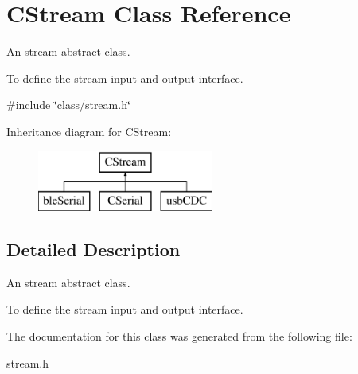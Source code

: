 \hypertarget{class_c_stream}{\section{C\-Stream Class Reference}
\label{class_c_stream}
}


An stream abstract class.\par
 To define the stream input and output interface.  




{\ttfamily \#include \char`\"{}class/stream.\-h\char`\"{}}

Inheritance diagram for C\-Stream\-:\begin{figure}[H]
\begin{center}
\leavevmode
\includegraphics[height=2.000000cm]{class_c_stream}
\end{center}
\end{figure}


\subsection{Detailed Description}
An stream abstract class.\par
 To define the stream input and output interface. 

The documentation for this class was generated from the following file\-:\begin{DoxyCompactItemize}
\item 
stream.\-h\end{DoxyCompactItemize}
